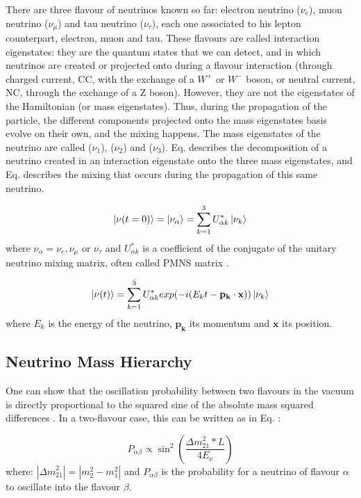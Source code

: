 There are three flavour of neutrinos known so far: electron neutrino ($\nu_{e}$), muon neutrino ($\nu_{\mu}$) and tau neutrino ($\nu_{\tau}$), each one associated to his lepton counterpart, electron, muon and tau. These flavours are called interaction eigenstates: they are the quantum states that we can detect, and in which neutrinos are created or projected onto during a flavour interaction (through charged current, CC, with the exchange of a $W^+$ or $W^-$ boson, or neutral current, NC, through the exchange of a Z boson). However, they are not the eigenstates of the Hamiltonian (or mass eigenstates). Thus, during the propagation of the particle, the different components projected onto the mass eigenstates basis evolve on their own, and the mixing happens. The mass eigenstates of the neutrino are called ($\nu_{1}$), ($\nu_{2}$) and ($\nu_{3}$). Eq.  describes the decomposition of a neutrino created in an interaction eigenstate onto the three mass eigenstates, and Eq.  describes the mixing that occurs during the propagation of this same neutrino.

\begin{equation}
    {\ket{\nu (t=0)}= \ket{\nu_\alpha} = \sum_{k=1}^{3}{U_{\alpha k} ^{*} \ket{\nu_k}}} 
    \label{LJFESUIH}   
\end{equation}
where $\nu_\alpha = \nu_e, \nu_\mu$ or $\nu_\tau$ and $U_{\alpha k} ^{*}$ is a coefficient of the conjugate of the unitary neutrino mixing matrix, often called PMNS matrix \citep{Patrignani:2016xqp}.

\begin{equation}
    {\ket{\nu (t)} = \sum_{k=1}^{3}{U_{\alpha k} ^{*} exp(-i(E_k t - \mathbf{p_k} \cdot \mathbf{x})) \ket{\nu_k}}}
    \label{ESFNIMNFU}
\end{equation}
where $E_k$ is the energy of the neutrino, $\mathbf{p_k}$ its momentum and $\mathbf{x}$ its position. 

\subsection{Neutrino Mass Hierarchy}

One can show that the oscillation probability between two flavours in the vacuum is directly proportional to the squared sine of the absolute mass squared differences \citep{Zuber:2004nz}. In a two-flavour case, this can be written as in Eq. :

\begin{equation}
    {P_{\alpha \beta}} \propto \sin ^2 \left(\frac{{\Delta m}_{21} ^2*L}{4E_\nu}\right)
    \label{AOZIEJ}
\end{equation}
where:
$|{\Delta m}_{21} ^2|=|{m_2 ^2-m_1 ^2}|$ and ${P_{\alpha \beta}}$ is the probability for a neutrino of flavour $\alpha$ to oscillate into the flavour $\beta$.

